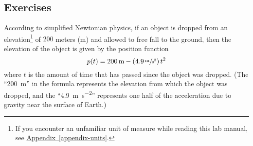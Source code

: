 \documentclass[12pt,]{book}
\theoremstyle{plain}
\theoremstyle{definition}
\theoremstyle{definition}
\theoremstyle{definition}
\theoremstyle{definition}
\theoremstyle{definition}
\numberwithin{equation}{section}
\newcommand{\fe}[2]{#1\mathopen{}\left(#2\right)\mathclose{}}
\begin{document}
\subsection[{Exercises}]{Exercises}\label{exercises-1}
\hypertarget{exercisegroup-velocity}{}\par\noindent According to simplified Newtonian physics, if an object is dropped from an elevation\footnote{If you encounter an unfamiliar unit of measure while reading this lab manual, see \hyperref[appendix-units]{Appendix~\ref{appendix-units}}.\label{fn-1}} of \(200\) meters (\si{\meter}) and allowed to free fall to the ground, then the elevation of the object is given by the position function \begin{equation*}\fe{p}{t}=200\,\text{m}-\left(4.9\,\sfrac{\text{m}}{\text{s}^2}\right)t^2\end{equation*} where \(t\) is the amount of time that has passed since the object was dropped. (The ``\SI{200}{\meter}'' in the formula represents the elevation from which the object was dropped, and the ``\SI{4.9}{\meter\per\second\tothe{2}}'' represents one half of the acceleration due to gravity near the surface of Earth.)%
\end{document}
